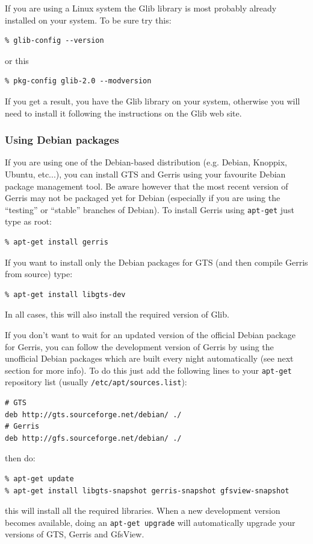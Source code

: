 \documentclass[a4paper]{article}
\begin{document}
If you are using a Linux system the Glib library is most probably
already installed on your system. To be sure try this:
\begin{verbatim}
% glib-config --version
\end{verbatim}
or this
\begin{verbatim}
% pkg-config glib-2.0 --modversion
\end{verbatim}
If you get a result, you have the Glib library on your system,
otherwise you will need to install it following the instructions on
the Glib web site.

\subsubsection{Using Debian packages}

If you are using one of the Debian-based distribution (e.g. Debian,
Knoppix, Ubuntu, etc...), you can install GTS and Gerris using your
favourite Debian package management tool. Be aware however that the
most recent version of Gerris may not be packaged yet for Debian
(especially if you are using the ``testing'' or ``stable'' branches of
Debian). To install Gerris using {\tt apt-get} just type as root:
\begin{verbatim}
% apt-get install gerris
\end{verbatim}
If you want to install only the Debian packages for GTS (and then
compile Gerris from source) type:
\begin{verbatim}
% apt-get install libgts-dev
\end{verbatim}
In all cases, this will also install the required version of Glib.

If you don't want to wait for an updated version of the official
Debian package for Gerris, you can follow the development version of
Gerris by using the unofficial Debian packages which are built every
night automatically (see next section for more info). To do this just
add the following lines to your {\tt apt-get} repository list (usually
{\tt /etc/apt/sources.list}):
\begin{verbatim}
# GTS
deb http://gts.sourceforge.net/debian/ ./
# Gerris
deb http://gfs.sourceforge.net/debian/ ./
\end{verbatim}
then do:
\begin{verbatim}
% apt-get update
% apt-get install libgts-snapshot gerris-snapshot gfsview-snapshot
\end{verbatim}
this will install all the required libraries. When a new development
version becomes available, doing an {\tt apt-get upgrade} will
automatically upgrade your versions of GTS, Gerris and GfsView.
\end{document}
